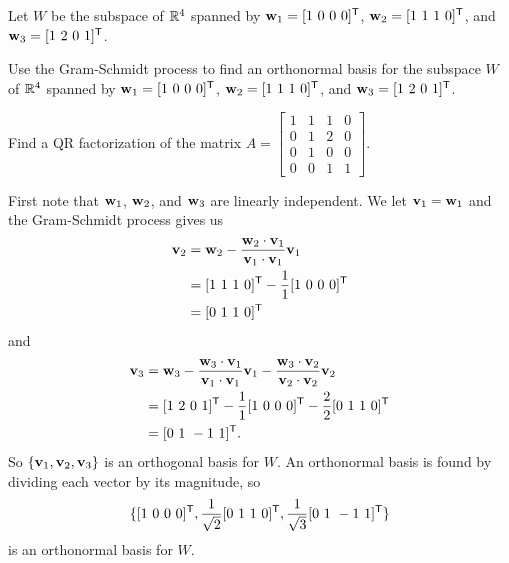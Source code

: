 \ExampleIntro

\begin{example} Let $W$ be the subspace of $\mathbb{R}^4$ spanned by
$\mathbf{w}_1 = [1 \ 0 \ 0 \ 0]^{\mathsf{T}}$, $\mathbf{w}_2 = [1 \ 1 \ 1 \ 0]^{\mathsf{T}}$, and $\mathbf{w}_3 = [1 \ 2 \ 0 \ 1]^{\mathsf{T}}$. 

\ba
\item Use the Gram-Schmidt process to find an orthonormal basis for the subspace $W$ of $\mathbb{R}^4$ spanned by
$\mathbf{w}_1 = [1 \ 0 \ 0 \ 0]^{\mathsf{T}}$, $\mathbf{w}_2 = [1 \ 1 \ 1 \ 0]^{\mathsf{T}}$, and $\mathbf{w}_3 = [1 \ 2 \ 0 \ 1]^{\mathsf{T}}$. 

\item Find a QR factorization of the matrix $A = \left[ \begin{array}{cccc} 1&1&1&0 \\ 0&1&2&0 \\ 0&1&0&0 \\ 0&0&1&1 \end{array} \right]$. 

\ea


\ExampleSolution
\ba
\item First note that $\mathbf{w}_1$, $\mathbf{w}_2$, and $\mathbf{w}_3$ are linearly independent. We let $\mathbf{v}_1 = \mathbf{w}_1$ and the Gram-Schmidt process gives us 
\begin{align*}
\mathbf{v}_2 &= \mathbf{w}_2 - \frac{\mathbf{w}_2 \cdot \mathbf{v}_1}{\mathbf{v}_1 \cdot \mathbf{v}_1} \mathbf{v}_1 \\
	&= [1 \ 1 \ 1 \ 0]^{\mathsf{T}} - \frac{1}{1}[1 \ 0 \ 0 \ 0]^{\mathsf{T}} \\
	&= [0 \ 1 \ 1 \ 0]^{\mathsf{T}}
\end{align*}
and
\begin{align*}
\mathbf{v}_3 &= \mathbf{w}_3 - \frac{\mathbf{w}_3 \cdot \mathbf{v}_1}{\mathbf{v}_1 \cdot \mathbf{v}_1} \mathbf{v}_1 - \frac{\mathbf{w}_3 \cdot \mathbf{v}_2}{\mathbf{v}_2 \cdot \mathbf{v}_2} \mathbf{v}_2 \\
	&= [1 \ 2 \ 0 \ 1]^{\mathsf{T}} - \frac{1}{1}[1 \ 0 \ 0 \ 0]^{\mathsf{T}} - \frac{2}{2}[0 \ 1 \ 1 \ 0]^{\mathsf{T}} \\
	&= [0 \ 1 \ -1 \ 1]^{\mathsf{T}}.
\end{align*}
So $\{\mathbf{v}_1, \mathbf{v}_2, \mathbf{v}_3\}$ is an orthogonal basis for $W$. An orthonormal basis is found by dividing each vector by its magnitude, so 
\[\{[1 \ 0 \ 0 \ 0]^{\mathsf{T}}, \frac{1}{\sqrt{2}} [0 \ 1 \ 1 \ 0]^{\mathsf{T}}, \frac{1}{\sqrt{3}}[0 \ 1 \ -1 \ 1]^{\mathsf{T}}\}\]
is an orthonormal basis for $W$. 


\end{example}
